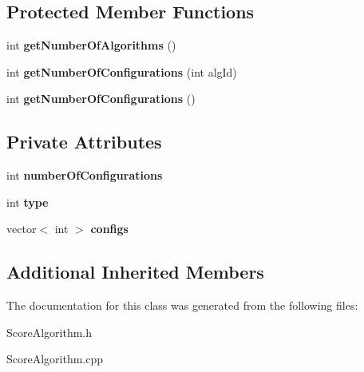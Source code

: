 \subsection*{Protected Member Functions}
\begin{DoxyCompactItemize}
\item 
\mbox{\label{classScoreAlgorithm_a96a7912c56aae7c5eeba05e9c7d73f19}} 
int {\bfseries get\+Number\+Of\+Algorithms} ()
\item 
\mbox{\label{classScoreAlgorithm_ac67021a4b1390d39649988c1512df779}} 
int {\bfseries get\+Number\+Of\+Configurations} (int alg\+Id)
\item 
\mbox{\label{classScoreAlgorithm_aed17e61b133b57a1d10202eebd3fc06f}} 
int {\bfseries get\+Number\+Of\+Configurations} ()
\end{DoxyCompactItemize}
\subsection*{Private Attributes}
\begin{DoxyCompactItemize}
\item 
\mbox{\label{classScoreAlgorithm_a5db73d908a5fcc2c6c28914f6ba3532b}} 
int {\bfseries number\+Of\+Configurations}
\item 
\mbox{\label{classScoreAlgorithm_a194ba64e3bef5f5e4d9eed35c896a9a3}} 
int {\bfseries type}
\item 
\mbox{\label{classScoreAlgorithm_a4683849279cb7a803919f09c2d13f907}} 
vector$<$ int $>$ {\bfseries configs}
\end{DoxyCompactItemize}
\subsection*{Additional Inherited Members}


The documentation for this class was generated from the following files\+:\begin{DoxyCompactItemize}
\item 
Score\+Algorithm.\+h\item 
Score\+Algorithm.\+cpp\end{DoxyCompactItemize}
